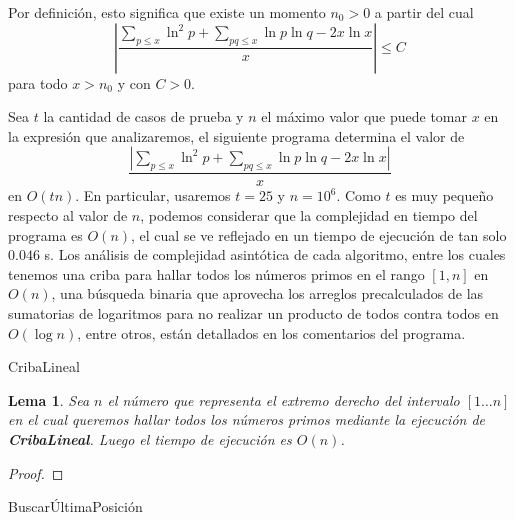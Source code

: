\documentclass{article}
\DeclarePairedDelimiter\floor{\lfloor}{\rfloor}
\newtheorem{lemma}[theorem]{Lema}
\theoremstyle{definition}
\theoremstyle{remark}
\begin{document}
Por definici\'on, esto significa que existe un momento $n_0 > 0$ a partir del cual
$$\left|\frac{\sum_{p \leq x} \ln^2 p + \sum_{pq \leq x} \ln p \ln q - 2x\ln x}{x}\right| \leq C$$
para todo $x > n_0$ y con $C > 0$.

Sea $t$ la cantidad de casos de prueba y $n$ el m\'aximo valor que puede tomar $x$ en la expresi\'on que analizaremos,
el siguiente programa determina el valor de 
$$\frac{|\sum_{p \leq x} \ln^2 p + \sum_{pq \leq x} \ln p \ln q - 2x\ln x|}{x}$$
en $O(tn)$. En particular, usaremos $t = 25$ y $n = 10^6$. Como $t$ es muy peque\~no respecto al valor de $n$, podemos
considerar que la complejidad en tiempo del programa es $O(n)$, el cual se ve reflejado en un tiempo de ejecuci\'on
de tan solo $0.046$ s. Los an\'alisis de complejidad asint\'otica de cada algoritmo, entre los cuales tenemos una criba para
hallar todos los n\'umeros primos en el rango $[1, n]$ en $O(n)$, una b\'usqueda binaria que aprovecha los arreglos precalculados de las sumatorias
de logaritmos para no realizar un producto de todos contra todos en $O(\log n)$, entre otros, est\'an detallados en los comentarios del programa.

\begin{algorithm}[H]
\SetAlgoLined
\DontPrintSemicolon
{}
\caption{CribaLineal\label{CL}}
\end{algorithm}

\begin{lemma}
Sea $n$ el n\'umero que representa el extremo derecho del intervalo $[1 \dots n]$
en el cual queremos hallar todos los n\'umeros primos mediante la ejecuci\'on de \textbf{CribaLineal}. Luego el tiempo de ejecuci\'on es $O(n)$.
\end{lemma}

\begin{proof}
\end{proof}

\begin{algorithm}[H]
\SetAlgoLined
\DontPrintSemicolon
{}
\caption{Buscar\'UltimaPosici\'on\label{BUP}}
\end{algorithm}
\end{document}
